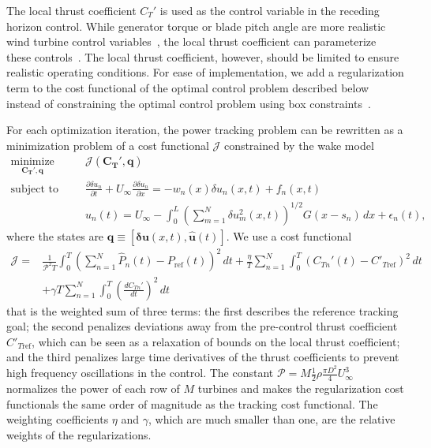 The local thrust coefficient $C_T'$ is used as the control variable in the receding horizon control. While generator torque or blade pitch angle are more realistic wind turbine control variables~\cite{Pao2011a}, the local thrust coefficient can parameterize these controls~\cite{Goit2015a}. The local thrust coefficient, however, should be limited to ensure realistic operating conditions. For ease of implementation, we add a regularization term to the cost functional of the optimal control problem described below instead of constraining the optimal control problem using box constraints~\cite{Goit2015a}. 

For each optimization iteration, the power tracking problem can be rewritten as a minimization problem of a cost functional $\mathcal{J}$ constrained by the wake model
\begin{align}
\label{eq:minimize_J}
\underset{\mathbf{C_{T}'}, \mathbf{q}}{\text{minimize}} \qquad & \mathcal{J}(\mathbf{C_T'}, \mathbf{q} ) \\
\label{eq:constraint1}
\text{subject to} \qquad & \frac{\partial \delta u_n}{\partial t} +U_\infty \frac{\partial \delta u_n}{\partial x} = -w_n(x) \delta u_n(x,t) + f_n(x,t) \\
\label{eq:constraint2}
& \hat{u}_n (t) = U_\infty - \int_0^L  \left(\sum_{m=1}^N \delta u_m^2(x,t)\right)^{1/2}G(x - s_n) \, dx + \epsilon_n(t),
\end{align}
where the states are $\mathbf{q} \equiv [\boldsymbol \delta \mathbf{u}(x,t), \mathbf{\hat{u}}(t)]$. We use a cost functional
\begin{equation}
\begin{split}
\mathcal{J} =& \frac{1}{\mathcal{P}^2T}\int_0^T \left( \sum_{n=1}^{N}\hat{P}_n(t)  - P_\text{ref}(t)  \right)^2 \, dt + \frac{\eta}{T}\sum_{n=1}^{N} \int_0^T \left( C_{Tn}'(t)  - C'_{T\text{ref}}\right)^2 \, dt \\
&+ \gamma T\sum_{n=1}^{N} \int_0^T \left( \frac{d C_{Tn}'}{dt}\right)^2 \, dt
\end{split}
\end{equation}
that is the weighted sum of three terms: the first describes the reference tracking goal; the second penalizes deviations away from the pre-control thrust coefficient $C'_{T\text{ref}}$,  which can be seen as a relaxation of bounds on the local thrust coefficient; and the third penalizes large time derivatives of the thrust coefficients to prevent high frequency oscillations in the control. The constant $\mathcal{P} = M \frac{1}{2}\rho\frac{ \pi D^2}{4} U_\infty^3 $ normalizes the power of each row of $M$ turbines and makes the regularization cost functionals the same order of magnitude as the tracking cost functional. The weighting coefficients $\eta$ and $\gamma$, which are much smaller than one, are the relative weights of the regularizations.

